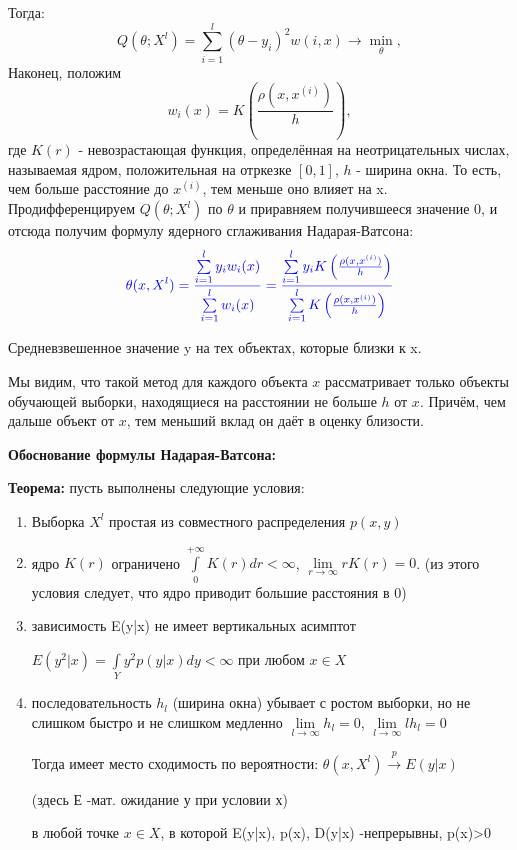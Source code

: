 Тогда:
\begin{equation*}
    \displaystyle Q(\theta; X^l) =  \sum\limits_{i=1}^l(\theta-y_i)^2w(i,x) \longrightarrow \min_\theta,
\end{equation*}
Наконец, положим
\begin{equation*}
    \displaystyle w_i(x) = K\left(\frac{\rho(x, x^{(i)})}{h}\right),
\end{equation*}
где $K(r)$ - невозрастающая функция, определённая на неотрицательных числах, называемая ядром, положительная на отркезке $[0,1]$, $h$ - ширина окна. То есть, чем больше расстояние до $x^{(i)}$, тем меньше оно влияет на x.
\\ Продифференцируем $Q(\theta; X^l)$ по $\theta$ и приравняем получившееся значение 0, и отсюда получим формулу ядерного сглаживания Надарая-Ватсона:
\begin{equation*}
   \textcolor{blue} {\theta(x, X^l)= \frac{\sum\limits_{i=1}^ly_iw_i(x)}{\sum\limits_{i=1}^lw_i(x)}= \frac{\sum\limits_{i=1}^ly_iK\left(\frac{\rho(x, x^{(i)})}{h}\right)}{\sum\limits_{i=1}^lK\left(\frac{\rho(x, x^{(i)})}{h}\right)}}
\end{equation*}

Средневзвешенное значение y на тех объектах, которые близки к x.

Мы видим, что такой метод для каждого объекта $x$ рассматривает только объекты обучающей выборки, находящиеся на расстоянии не больше $h$ от $x$. Причём, чем дальше объект от $x$, тем  меньший вклад он даёт в оценку близости.



\textbf{Обоснование формулы Надарая-Ватсона:}

\textbf{Теорема:}
пусть выполнены следующие условия:
\begin{enumerate}
    \item Выборка $X^l$ простая из совместного распределения $p(x,y)$
    \item ядро $K(r)$ ограничено $\displaystyle\int\limits_{0}^{+\infty} K(r)dr < \infty$,
    $\lim\limits_{r \to \infty}  rK(r) =0$.
    (из этого условия следует, что ядро приводит большие расстояния в 0)
    \item зависимость E(y|x) не имеет вертикальных асимптот

    $E(y^2|x)=\displaystyle\int\limits_{Y} y^2p(y|x)dy < \infty$ при любом $x \in X$
    \item последовательность $h_l$ (ширина окна) убывает с ростом выборки, но не слишком быстро и не слишком медленно
    $\lim\limits_{l\to \infty} h_l=0$,
    $\lim\limits_{l\to \infty} l h_l=0$

    Тогда имеет место сходимость по вероятности:
    $\theta(x, X^l) \xrightarrow{p}E(y|x) $

(здесь Е -мат. ожидание у при условии х)

    в любой точке $x \in X$, в которой E(y|x),  p(x), D(y|x) -непрерывны, p(x)>0
\end{enumerate}

